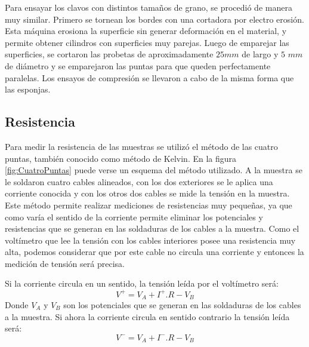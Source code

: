\documentclass[a4paper,12pt,fleqn,twoside,openany]{book}
\begin{document}
 

Para ensayar los clavos con distintos tamaños de grano, se procedió de manera muy similar. Primero se tornean los bordes con una cortadora por electro erosión. Esta máquina erosiona la superficie sin generar deformación en el material, y permite obtener cilindros con superficies muy parejas. Luego de emparejar las superficies, se cortaron las probetas de aproximadamente $25 mm$ de largo y $5$ $mm$ de diámetro y se emparejaron las puntas para que queden perfectamente paralelas. 
Los ensayos de compresión se llevaron a cabo de la misma forma que las esponjas. 
 

\subsection{Resistencia} \label{CuatroPuntas}




Para medir la resistencia de las muestras se utilizó el método de las cuatro puntas, también conocido como método de Kelvin. En la figura 
\ref{fig:CuatroPuntas} puede 
verse un esquema del método utilizado. A la muestra se le soldaron cuatro cables alineados, con los dos exteriores se le aplica una corriente conocida y con los 
otros dos cables se mide la tensión en la muestra. Este método permite realizar mediciones de resistencias muy pequeñas, ya que como varía
el sentido de la corriente permite eliminar los potenciales y resistencias que se generan en las soldaduras de los cables a la muestra.
Como el voltímetro que lee la tensión con los cables interiores posee una resistencia muy alta, podemos considerar que por este cable no circula una corriente
y entonces la medición de tensión será precisa. 

Si la corriente circula en un sentido, la tensión leída por el voltímetro será:
\begin{equation}
 V^+= V_A +I^+ . R - V_B 
\end{equation}
Donde $V_A$ y $V_B$ son los potenciales que se generan en las soldaduras de los cables a la muestra. Si ahora la corriente circula en sentido contrario la tensión leída será:
\begin{equation}
 V^-= V_A +I^- . R - V_B 
\end{equation}
\end{document}
